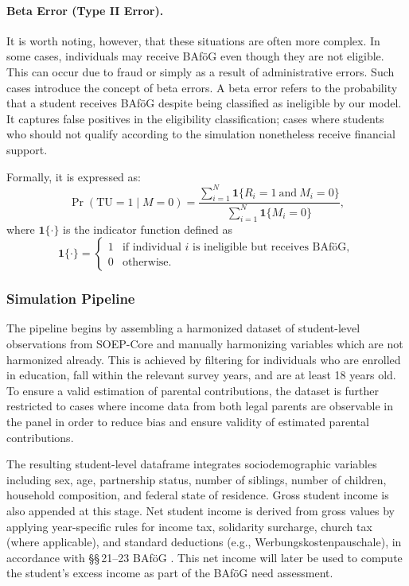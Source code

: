 \paragraph{Beta Error (Type II Error).}  
It is worth noting, however, that these situations are often more complex. 
In some cases, individuals may receive BAföG even though they are not eligible. 
This can occur due to fraud or simply as a result of administrative errors. 
Such cases introduce the concept of beta errors. 
A beta error refers to the probability that a student receives BAföG despite being classified as ineligible by our model. 
It captures false positives in the eligibility classification; cases where students who should not qualify according to the simulation nonetheless receive financial support.

Formally, it is expressed as:
\begin{equation}
\Pr(\text{TU} = 1 \mid M = 0) = \frac{\sum_{i=1}^{N} \mathbf{1}\{R_i = 1 \ \text{and} \ M_i = 0\}}{\sum_{i=1}^{N} \mathbf{1}\{M_i = 0\}},
\end{equation}
where \( \mathbf{1}\{\cdot\} \) is the indicator function defined as
\[
\mathbf{1}\{\cdot\} =
\begin{cases}
1 & \text{if individual } i \text{ is ineligible but receives BAföG}, \\
0 & \text{otherwise}.
\end{cases}
\]

\subsubsection{Simulation Pipeline}
The pipeline begins by assembling a harmonized dataset of student-level observations from SOEP-Core and manually harmonizing variables which are not harmonized already.
This is achieved by filtering for individuals who are enrolled in education, fall within the relevant survey years, and are at least 18 years old. 
To ensure a valid estimation of parental contributions, the dataset is further restricted to cases where income data from both legal parents are observable in the panel in order to reduce bias and ensure validity of estimated parental contributions.

The resulting student-level dataframe integrates sociodemographic variables including sex, age, partnership status, number of siblings, number of children, household composition, and federal state of residence. 
Gross student income is also appended at this stage. 
Net student income is derived from gross values by applying year-specific rules for income tax, solidarity surcharge, church tax (where applicable), and standard deductions (e.g., Werbungskostenpauschale), in accordance with §§\,21–23 BAföG \citep{bafoeg_law}.
This net income will later be used to compute the student’s excess income as part of the BAföG need assessment.

